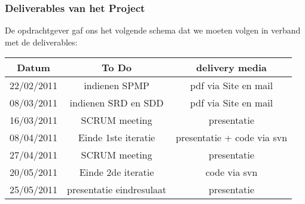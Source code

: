 \documentclass{article}
\begin{document}
\subsubsection{Deliverables van het Project}


De opdrachtgever gaf ons het volgende schema dat we moeten volgen in verband met de deliverables:
	

\begin{center}
\begin{tabular}[t]{|c|c|c|}
\hline
Datum	& To Do & delivery media  \\
\hline
\hline
22/02/2011 &	indienen SPMP & pdf via Site en mail\\
\hline
08/03/2011 &	indienen SRD en SDD & pdf via Site en mail\\
\hline
16/03/2011 &	SCRUM meeting & presentatie\\
\hline
08/04/2011 &	Einde 1ste iteratie & presentatie + code via svn \\
\hline
27/04/2011 &	SCRUM meeting & presentatie \\
\hline
20/05/2011 &	Einde 2de iteratie & code via svn\\
\hline
25/05/2011 &	presentatie eindresulaat & presentatie\\
\hline
\end{tabular}
\end{center}
\end{document}

